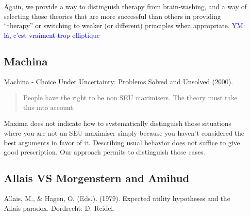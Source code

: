 \documentclass[preprint, french, english, 11pt, authoryear]{elsarticle}%
\newcommand{\commentYM}[1]{\textcolor{blue}{YM: #1}}
\begin{document}
Again, we provide a way to distinguish therapy from brain-washing, and a way of selecting those theories that are more successful than others in providing “therapy” or switching to weaker (or different) principles when appropriate.
\commentYM{là, c'est vraiment trop elliptique}

\subsection{Machina}
Machina - Choice Under Uncertainty: Problems Solved and Unsolved (2000).

\begin{quote}
	People have the right to be non SEU maximisers. The theory must take this into account.
\end{quote}

Maxima does not indicate how to systematically distinguish those situations where you are not an SEU maximiser simply because you haven’t considered the best arguments in favor of it. Describing usual behavior does not suffice to give good prescription. Our approach permits to distinguish those cases.

\subsection{Allais VS Morgenstern and Amihud}
Allais, M., \& Hagen, O. (Eds.). (1979). Expected utility hypotheses and the Allais paradox. Dordrecht: D. Reidel.
\end{document}
